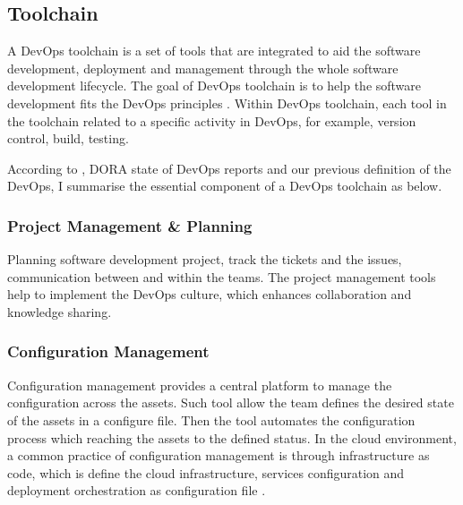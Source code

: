 \subsection{Toolchain}
A DevOps toolchain is a set of tools that are integrated to aid the software development, deployment and management through the whole software development lifecycle. The goal of DevOps toolchain is to help the software development fits the DevOps principles \cite{DevOpsto7:online}\cite{Toolchai10:online}\cite{WhatisaD20:online}. Within DevOps toolchain, each tool in the toolchain related to a specific activity in DevOps, for example, version control, build, testing.
\par
According to \cite{WhatisaD20:online}, DORA state of DevOps reports \cite{forsgrenaccelerate}\cite{velasquez2014state}\cite{forsgren20192019} and our previous definition of the DevOps, I summarise the essential component of a DevOps toolchain as below.
\subsubsection{Project Management \& Planning}
Planning software development project, track the tickets and the issues, communication between and within the teams. The project management tools help to implement the DevOps culture, which enhances collaboration and knowledge sharing.
\subsubsection{Configuration Management}
Configuration management provides a central platform to manage the configuration across the assets. Such tool allow the team defines the desired state of the assets in a configure file. Then the tool automates the configuration process which reaching the assets to the defined status. In the cloud environment, a common practice of configuration management is through infrastructure as code, which is define the cloud infrastructure, services configuration and deployment orchestration as configuration file \cite{7965401}.
